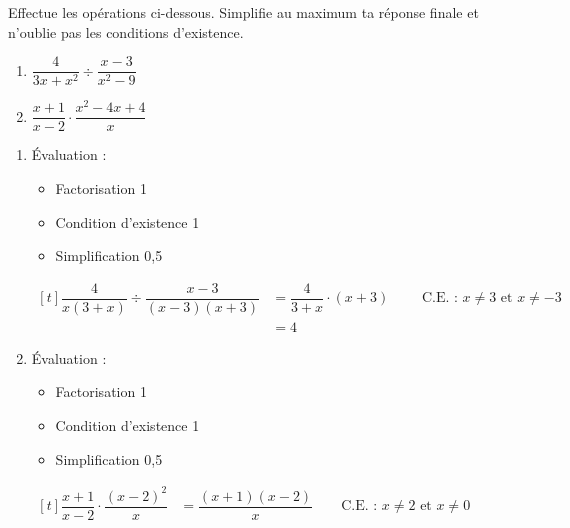 \documentclass[../partie1.tex]{subfiles}
\begin{document}
\begin{exercise}[points=5]
    Effectue les opérations ci-dessous. Simplifie au maximum ta réponse finale et n'oublie pas les conditions d'existence.
    \begin{enumerate}[cols=2]
        \item %
              $\dfrac{4}{3x+x^2} \div \dfrac{x-3}{x^2-9}$
        \item %
              $\dfrac{x+1}{x-2}\cdot\dfrac{x^2-4x+4}{x}$
    \end{enumerate}
\end{exercise}
\begin{solution}
    \begin{enumerate}
        \item
        Évaluation :
        \begin{itemize}
            \item Factorisation \hfill 1
            \item Condition d'existence \hfill 1
            \item Simplification \hfill 0,5
        \end{itemize} 
              $\begin{aligned}[t]
                      \dfrac{4}{x(3+x)}\div\dfrac{x-3}{(x-3)(x+3)} & = \dfrac{4}{3+x}\cdot (x+3)
                      \qquad\text{ C.E. : }x\ne 3\text{ et } x\ne -3\\
                                                                   & = 4
                  \end{aligned}$
        \item
        Évaluation :
        \begin{itemize}
            \item Factorisation \hfill 1
            \item Condition d'existence \hfill 1
            \item Simplification \hfill 0,5
        \end{itemize} 
        $\begin{aligned}[t]
            \dfrac{x+1}{x-2} \cdot \dfrac{(x-2)^2}{x} 
            &= \dfrac{(x+1)(x-2)}{x}\qquad\text{C.E. : }x\ne 2 \text{ et } x \ne 0\\
        \end{aligned}$
    \end{enumerate}
\end{solution}
\end{document}
